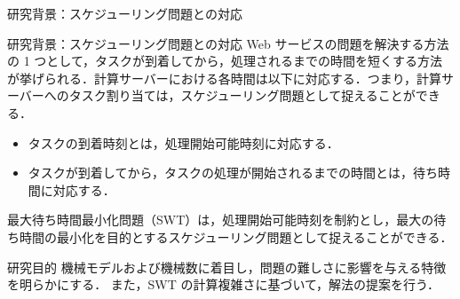 \documentclass[dvipdfmx]{beamer}
\begin{document}
    \begin{frame}{研究背景：スケジューリング問題との対応}
      \begin{block}{研究背景：スケジューリング問題との対応}
        Web サービスの問題を解決する方法の 1 つとして，\alert{タスクが到着してから，処理されるまでの時間を短くする}方法が挙げられる．計算サーバーにおける各時間は以下に対応する．つまり，計算サーバーへのタスク割り当ては，スケジューリング問題として捉えることができる．
        \begin{itemize}
          \item タスクの到着時刻とは，\alert{処理開始可能時刻}に対応する．
          \item タスクが到着してから，タスクの処理が開始されるまでの時間とは，\alert{待ち時間}に対応する．
        \end{itemize}
        \alert{最大待ち時間最小化問題（SWT）}は，処理開始可能時刻を制約とし，最大の待ち時間の最小化を目的とするスケジューリング問題として捉えることができる．
      \end{block}

      \begin{block}{研究目的}
        機械モデルおよび機械数に着目し，問題の難しさに影響を与える特徴を明らかにする．
        また，SWT の計算複雑さに基づいて，解法の提案を行う．
      \end{block}

    \end{frame}
\end{document}

